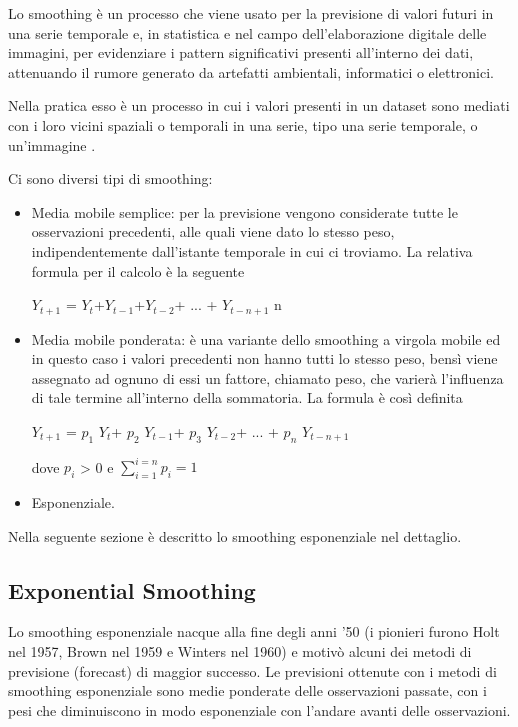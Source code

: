 \documentclass[12pt,a4paper,twoside,openright]{book}
\begin{document}
Lo smoothing è un processo che viene usato per la previsione di valori futuri in una serie temporale e, in statistica e nel campo dell'elaborazione digitale delle immagini, per evidenziare i pattern significativi presenti all'interno dei dati, attenuando il rumore generato da artefatti ambientali, informatici o elettronici. 

Nella pratica esso è un processo in cui i valori presenti in un dataset sono mediati con i loro vicini spaziali o temporali in una serie, tipo una serie temporale, o un'immagine \cite{6a}. 

Ci sono diversi tipi di smoothing:
\begin{itemize}
\item Media mobile semplice: per la previsione vengono considerate tutte le osservazioni precedenti, alle quali viene dato lo stesso peso, indipendentemente dall'istante temporale in cui ci troviamo. La relativa formula per il calcolo è la seguente

\begin{center}
$Y_{t+1}$ = $Y_{t}$+$Y_{t-1}$+$Y_{t-2}$+ ... + $Y_{t-n+1}$ n
\end{center}

\item Media mobile ponderata: è una variante dello smoothing a virgola mobile ed in questo caso i valori precedenti non hanno tutti lo stesso peso, bensì viene assegnato ad ognuno di essi un fattore, chiamato peso, che varierà l'influenza di tale termine all'interno della sommatoria. La formula è così definita

\begin{center}
$Y_{t+1}$ = $p_{1}$ $Y_{t}$+ $p_{2}$ $Y_{t-1}$+ $p_{3}$ $Y_{t-2}$+ ... + $p_{n}$ $Y_{t-n+1}$
\end{center}

dove 
$p_{{i}}$ > {0} e $\sum_{i=1}^{i={n}}{ p_{{i}}} = {1}$


\item Esponenziale.
\end{itemize}

Nella seguente sezione è descritto lo smoothing esponenziale nel dettaglio.
\newpage
\subsection{Exponential Smoothing}
Lo smoothing esponenziale nacque alla fine degli anni '50 (i pionieri furono Holt nel 1957, Brown nel 1959 e Winters nel 1960) e motivò alcuni dei metodi di previsione (forecast) di maggior successo. Le previsioni ottenute con i metodi di smoothing esponenziale sono medie ponderate delle osservazioni passate, con i pesi che diminuiscono in modo esponenziale con l'andare avanti delle osservazioni. 
\end{document}
